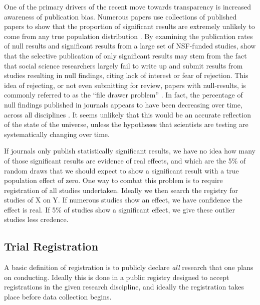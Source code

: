 \documentclass[12pt] {article}
\begin{document}
One of the primary drivers of the recent move towards transparency is
increased awareness of publication bias. Numerous papers use collections
of published papers to show that the proportion of significant results
are extremely unlikely to come from any true population distribution
\citep{delong_are_1992, gerber_testing_2001,  ioannidis_why_2005}. By examining the publication rates of null results and
significant results from a large set of NSF-funded studies, \cite{franco_publication_2014} show that the selective publication of only
significant results may stem from the fact that social science
researchers largely fail to write up and submit results from studies
resulting in null findings, citing lack of interest or fear of
rejection. This idea of rejecting, or not even submitting for review, papers with null-results, is commonly referred to as the ``file drawer problem'' \citep{rosenthal1979file}. In fact, the percentage of null findings published in
journals appears to have been decreasing over time, across all
disciplines \citep{fanelli_negative_2012}. It seems unlikely that this would
be an accurate reflection of the state of the universe, unless the hypotheses that scientists are testing are systematically changing over time. 

If journals only
publish statistically significant results, we have no idea how many of
those significant results are evidence of real effects, and which are
the 5\% of random draws that we should expect to show a significant
result with a true population effect of zero. One way to combat this problem is to
require registration of all studies undertaken. Ideally we then search
the registry for studies of X on Y. If numerous studies show an
effect, we have confidence the effect is real. If 5\% of studies show a
significant effect, we give these outlier studies less credence.

\subsection{Trial Registration}\label{trial-registration}

A basic definition of registration is to publicly declare \emph{all}
research that one plans on conducting. Ideally this is done in a public
registry designed to accept registrations in the given research discipline,
and ideally the registration takes place before data collection begins.
\end{document}
